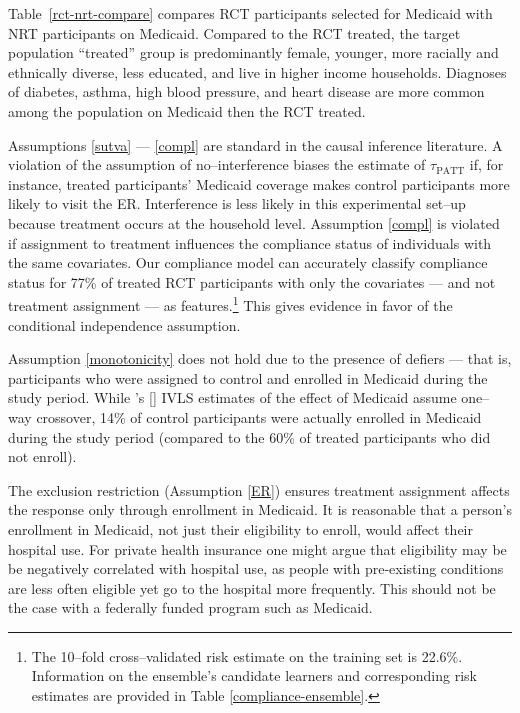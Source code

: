 \documentclass[12pt]{article}
\newcommand{\possessivecite}[1]{\citeauthor{#1}'s [\citeyear{#1}]}
\begin{document}
Table~\ref{rct-nrt-compare} compares RCT participants selected for Medicaid with NRT participants on Medicaid. Compared to the RCT treated, the target population ``treated''  group is predominantly female, younger, more racially and ethnically diverse, less educated, and live in higher income households. Diagnoses of diabetes, asthma, high blood pressure, and heart disease are more common among the population on Medicaid then the RCT treated.


Assumptions \ref{sutva} ---  \ref{compl} are standard in the causal inference literature. A violation of the assumption of no--interference biases the estimate of $\tau_{\text{PATT}}$ if, for instance, treated participants' Medicaid coverage makes control participants more likely to visit the ER.  Interference is less likely in this experimental set--up because treatment occurs at the household level.  Assumption \ref{compl} is violated if assignment to treatment influences the compliance status of individuals with the same covariates. Our compliance model can accurately classify compliance status for 77\% of treated RCT participants with only the covariates --- and not treatment assignment --- as features.\footnote{The 10--fold cross--validated risk estimate on the training set is 22.6\%. Information on the ensemble's candidate learners and corresponding risk estimates are provided in Table \ref{compliance-ensemble}.}  This gives evidence in favor of the conditional independence assumption.
 
Assumption \ref{monotonicity} does not hold due to the presence of defiers --- that is, participants who were assigned to control and enrolled in Medicaid during the study period. While \possessivecite{finkelstein2012} IVLS estimates of the effect of Medicaid assume one--way crossover, 14\% of control participants were actually enrolled in Medicaid during the study period (compared to the 60\% of treated participants who did not enroll).

The exclusion restriction (Assumption \ref{ER}) ensures treatment assignment affects the response only through enrollment in Medicaid. It is reasonable that a person's enrollment in Medicaid, not just their eligibility to enroll, would affect their hospital use.  For private health insurance one might argue that eligibility may be be negatively correlated with hospital use, as people with pre-existing conditions are less often eligible yet go to the hospital more frequently.  This should not be the case with a federally funded program such as Medicaid. 
 
\end{document}
